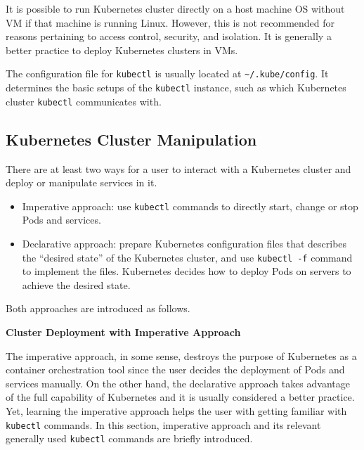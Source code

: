 It is possible to run Kubernetes cluster directly on a host machine OS without VM if that machine is running Linux. However, this is not recommended for reasons pertaining to access control, security, and isolation. It is generally a better practice to deploy Kubernetes clusters in VMs.

The configuration file for \verb|kubectl| is usually located at \verb|~/.kube/config|. It determines the basic setups of the \verb|kubectl| instance, such as which Kubernetes cluster \verb|kubectl| communicates with.

\subsection{Kubernetes Cluster Manipulation}

There are at least two ways for a user to interact with a Kubernetes cluster and deploy or manipulate services in it.
\begin{itemize}
  \item Imperative approach: use \verb|kubectl| commands to directly start, change or stop Pods and services.
  \item Declarative approach: prepare Kubernetes configuration files that describes the ``desired state'' of the Kubernetes cluster, and use \verb|kubectl -f| command to implement the files. Kubernetes decides how to deploy Pods on servers to achieve the desired state.
\end{itemize}
Both approaches are introduced as follows. 

\vspace{0.1in}
\noindent \textbf{Cluster Deployment with Imperative Approach}
\vspace{0.1in}

The imperative approach, in some sense, destroys the purpose of Kubernetes as a container orchestration tool since the user decides the deployment of Pods and services manually. On the other hand, the declarative approach takes advantage of the full capability of Kubernetes and it is usually considered a better practice. Yet, learning the imperative approach helps the user with getting familiar with \verb|kubectl| commands. In this section, imperative approach and its relevant generally used \verb|kubectl| commands are briefly introduced.

